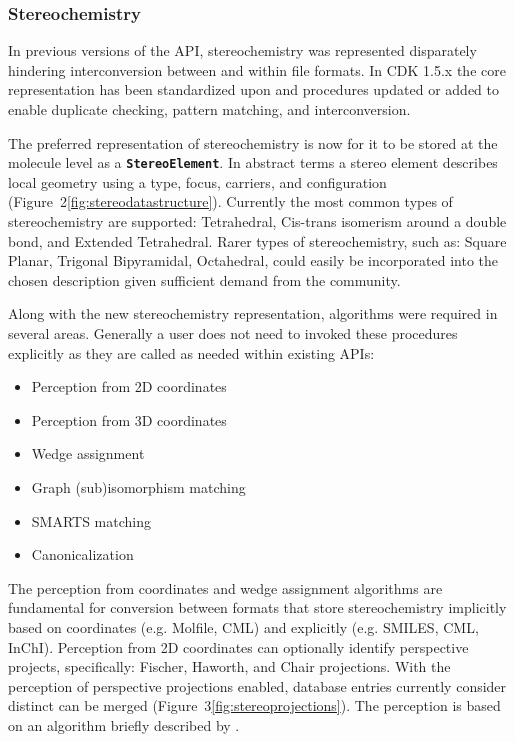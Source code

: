 \documentclass[10pt]{bmcart}
\begin{document}
  \subsubsection*{Stereochemistry}

  In previous versions of the API, stereochemistry was represented disparately hindering 
  interconversion between and within file formats. In CDK 1.5.x the core representation 
  has been standardized upon and procedures updated or added to enable duplicate checking,
  pattern matching, and interconversion.

  The preferred representation of stereochemistry is now for it to be stored at the molecule
  level as a \texttt{\textbf{StereoElement}}. In abstract terms a stereo element describes local
  geometry using a type, focus, carriers, and configuration (Figure~2\ref{fig:stereodatastructure}).
  Currently the most common types of stereochemistry are supported: Tetrahedral, Cis-trans isomerism 
  around a double bond, and Extended Tetrahedral. Rarer types of stereochemistry, such as: Square 
  Planar, Trigonal Bipyramidal, Octahedral, could easily be incorporated into the chosen description 
  given sufficient demand from the community.


  Along with the new stereochemistry representation, algorithms were required in several areas. Generally
  a user does not need to invoked these procedures explicitly as they are called as needed within existing
  APIs:

  \begin{itemize}
   \item Perception from 2D coordinates
   \item Perception from 3D coordinates
   \item Wedge assignment
   \item Graph (sub)isomorphism matching
   \item SMARTS matching
   \item Canonicalization
  \end{itemize}

  The perception from coordinates and wedge assignment algorithms are fundamental for conversion
  between formats that store stereochemistry implicitly based on coordinates (e.g. Molfile, CML) and 
  explicitly (e.g. SMILES, CML, InChI). Perception from 2D coordinates can optionally identify
  perspective projects, specifically: Fischer, Haworth, and Chair projections. With the perception of 
  perspective projections enabled, database entries currently consider distinct can be merged
  (Figure~3\ref{fig:stereoprojections}). The perception is based on an algorithm briefly 
  described by \cite{Karapetyan2015}.
\end{document}
